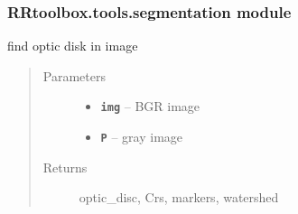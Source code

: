 \documentclass[letterpaper,10pt,english]{sphinxmanual}
\begin{document}
\subsubsection{RRtoolbox.tools.segmentation module}
\label{RRtoolbox.tools:rrtoolbox-tools-segmentation-module}\label{RRtoolbox.tools:module-RRtoolbox.tools.segmentation}

\begin{fulllineitems}
\label{RRtoolbox.tools:RRtoolbox.tools.segmentation.find_optic_disc}
find optic disk in image
\begin{quote}\begin{description}
\item[{Parameters}] \leavevmode\begin{itemize}
\item {} 
\textbf{\texttt{img}} -- BGR image

\item {} 
\textbf{\texttt{P}} -- gray image

\end{itemize}

\item[{Returns}] \leavevmode
optic\_disc, Crs, markers, watershed

\end{description}\end{quote}

\end{fulllineitems}

\end{document}
